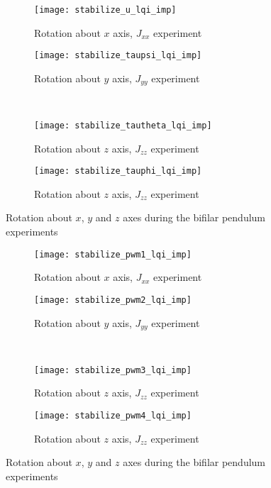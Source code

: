 \begin{appendices}
\begin{figure}[h]
\begin{subfigure}{.4\linewidth}
\centering
\texttt{[image: stabilize\_u\_lqi\_imp]}
\caption{Rotation about $x$ axis, $J_{xx}$ experiment}
\label{fig:stabilize_u_lqi_imp}
\end{subfigure}%
\begin{subfigure}{.4\linewidth}
\centering
\texttt{[image: stabilize\_taupsi\_lqi\_imp]}
\caption{Rotation about $y$ axis, $J_{yy}$ experiment}
\label{fig:stabilize_taupsi_lqi_imp}
\end{subfigure}\\[1ex]
\begin{subfigure}{0.4\linewidth}
\centering
\texttt{[image: stabilize\_tautheta\_lqi\_imp]}
\caption{Rotation about $z$ axis, $J_{zz}$ experiment}
\label{fig:stabilize_tautheta_lqi_imp}
\end{subfigure}
\begin{subfigure}{0.4\linewidth}
\centering
\texttt{[image: stabilize\_tauphi\_lqi\_imp]}
\caption{Rotation about $z$ axis, $J_{zz}$ experiment}
\label{fig:stabilize_tauphi_lqi_imp}
\end{subfigure}
\caption{Rotation about $x$, $y$ and $z$ axes during the bifilar pendulum experiments}
\label{fig:stabilize_control_lqi}
\end{figure}

\begin{figure}[h]
\begin{subfigure}{.4\linewidth}
\centering
\texttt{[image: stabilize\_pwm1\_lqi\_imp]}
\caption{Rotation about $x$ axis, $J_{xx}$ experiment}
\label{fig:stabilize_pwm_lqi_imp}
\end{subfigure}%
\begin{subfigure}{.4\linewidth}
\centering
\texttt{[image: stabilize\_pwm2\_lqi\_imp]}
\caption{Rotation about $y$ axis, $J_{yy}$ experiment}
\label{fig:stabilize_pwm2_lqi_imp}
\end{subfigure}\\[1ex]
\begin{subfigure}{0.4\linewidth}
\centering
\texttt{[image: stabilize\_pwm3\_lqi\_imp]}
\caption{Rotation about $z$ axis, $J_{zz}$ experiment}
\label{fig:stabilize_pwm3_lqi_imp}
\end{subfigure}
\begin{subfigure}{0.4\linewidth}
\centering
\texttt{[image: stabilize\_pwm4\_lqi\_imp]}
\caption{Rotation about $z$ axis, $J_{zz}$ experiment}
\label{fig:stabilize_pwm4_lqi_imp}
\end{subfigure}
\caption{Rotation about $x$, $y$ and $z$ axes during the bifilar pendulum experiments}
\label{fig:stabilize_pwm_lqi}
\end{figure}


\end{appendices}
